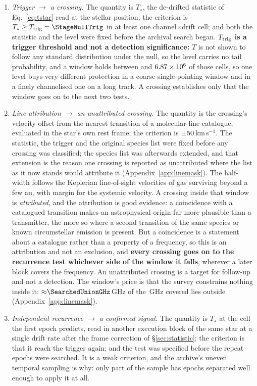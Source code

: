 \begin{enumerate}[label=(\roman*),leftmargin=1.9em,itemsep=3pt,topsep=3pt,parsep=0pt]
\item \emph{Trigger $\to$ a crossing.} The quantity is $T_\star$, the
de-drifted statistic of Eq.~\ref{eq:tstar} read at the stellar position; the
criterion is $T_\star\geq T_{\rm trig}=\StageNullTrig$ in at least one
channel$\times$drift cell; and both the statistic and the level were fixed
before the archival search began. \textbf{$T_{\rm trig}$ is a trigger
threshold and not a detection significance:} $T$ is not shown to follow any
standard distribution under the null, so the level carries no tail
probability, and a window holds between \TuCellsLo{} and $6.87 \times 10^{6}$ of
those cells, so one level buys very different protection in a coarse
single-pointing window and in a finely channelised one on a long track. A
crossing establishes only that the window goes on to the next two tests.
\item \emph{Line attribution $\to$ an unattributed crossing.} The quantity
is the crossing's velocity offset from the nearest transition of a
molecular-line catalogue, evaluated in the star's own rest frame; the
criterion is $\pm50$\,km\,s$^{-1}$. The statistic, the trigger and
the original species list were fixed before any crossing was classified; the
species list was afterwards extended, and that extension is the reason one
crossing is reported as unattributed where the list as it now stands would
attribute it (Appendix~\ref{app:linemask}). The half-width follows the Keplerian line-of-sight velocities of gas
surviving beyond a few au, with margin for the systemic velocity. A crossing
inside that window is \emph{attributed}, and the attribution is good
evidence: a coincidence with a catalogued transition makes an astrophysical
origin far more plausible than a transmitter, the more so where a second
transition of the same species or known circumstellar emission is present.
But a coincidence is a statement about a catalogue rather than a property of
a frequency, so this is an attribution and not an exclusion, and
\textbf{every crossing goes on to the recurrence test whichever side of the
window it falls}, wherever a later block covers the frequency. An unattributed crossing is a target for follow-up and not
a detection. The window's price is that the survey constrains nothing inside
it: ${\approx}\SearchedUnionGHz$\,GHz of the \UnionGHz\,GHz covered lies
outside (Appendix~\ref{app:linemask}).
\item \emph{Independent recurrence $\to$ a confirmed signal.} The quantity is
$T_\star$ at the cell the first epoch predicts, read in another execution
block of the same star at a single drift rate after the frame correction of
\S\ref{sec:statistic}; the criterion is that it reach the trigger again; and
the test was specified before the repeat epochs were searched. It is a weak
criterion, and the archive's uneven temporal sampling is why: only part of
the sample has epochs separated well enough to apply it at all.
\end{enumerate}


